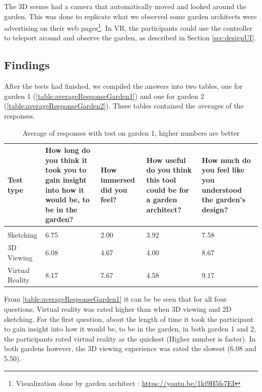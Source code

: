 The 3D scenes had a camera that automatically moved and looked around the garden. This was done to replicate what we observed some garden architects were advertising on their web pages\footnote{Visualization done by garden architect : \url{https://youtu.be/1ki9H5fs7EI}}. In VR, the participants could use the controller to teleport around and observe the garden, as described in Section \ref{sec:designUI}. 

\subsection{Findings}
After the tests had finished, we compiled the answers into two tables, one for garden 1 (\autoref{table:averageResponseGarden1}) and one for garden 2 (\autoref{table:averageResponseGarden2}). These tables contained the averages of the responses.
\begin{table}[H]
	\centering
	\caption{Average of responses with test on garden 1, higher numbers are better}
	\label{table:averageResponseGarden1}
	\begin{tabular}{p{3cm}|p{3cm}|p{2cm}|p{3cm}|p{3cm}}
		Test type       & How long do you think it took you to gain insight into how it would be, to be in the garden? & How immersed did you feel? & How useful do you think this tool could be for a garden architect? & How much do you feel like you understood the garden's design? \\ \hline
		&&&&\\
		Sketching       & 6.75    & 2.00    & 3.92      & 7.58            \\
		3D Viewing      & 6.08  & 4.67  & 4.00    & 8.67               \\
		Virtual Reality & 8.17     & 7.67     & 4.58      & 9.17    
	\end{tabular}
\end{table}
From \autoref{table:averageResponseGarden1} it can be be seen that for all four questions, Virtual reality was rated higher than when 3D viewing and 2D sketching. For the first question, about the length of time it took the participant to gain insight into how it would be, to be in the garden, in both garden 1 and 2, the participants rated virtual reality as the quickest (Higher number is faster). In both gardens however, the 3D viewing experience was rated the slowest (6.08 and 5.50).
